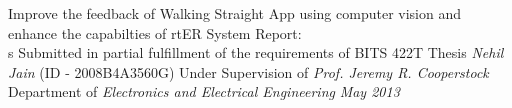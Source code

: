 \documentclass[letterpaper,12pt]{report}
\begin{document}

\thesistitle
	{Improve the feedback of Walking Straight App using computer vision and enhance the capabilties of rtER System Report: \\s
	 Submitted in partial fulfillment of the requirements of BITS 422T Thesis}
	{\emph{Nehil Jain}  	(ID - 2008B4A3560G)}
	{Under Supervision of \emph{Prof. Jeremy R. Cooperstock} }
	{Department of \emph{Electronics and Electrical Engineering}
	 }
	{\emph{May 2013} }











\end{document}
